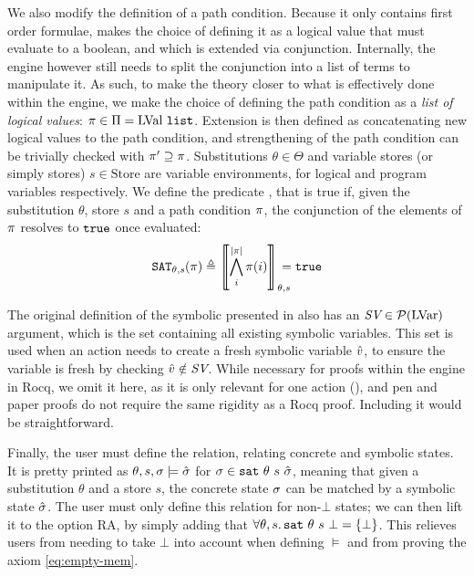 We also modify the definition of a path condition. Because it only contains first order formulae, \cite{cse1,cse2} makes the choice of defining it as a logical value that must evaluate to a boolean, and which is extended via conjunction. Internally, the engine however still needs to split the conjunction into a list of terms to manipulate it. As such, to make the theory closer to what is effectively done within the engine, we make the choice of defining the path condition as a \emph{list of logical values}: $\pi\in\Pi=\text{LVal}~\texttt{list}$. Extension is then defined as concatenating new logical values to the path condition, and strengthening of the path condition can be trivially checked with $\pi'\supseteq\pi$. Substitutions $\theta\in\Theta$ and variable stores (or simply stores) $s\in\text{Store}$ are variable environments, for logical and program variables respectively. We define the predicate , that is true if, given the substitution $\theta$, store $s$ and a path condition $\pi$, the conjunction of the elements of $\pi$ resolves to $\texttt{true}$ once evaluated:
\begin{align*}
	\texttt{SAT}_{\mathit{\theta,s}}(\pi) \triangleq \left\llbracket \bigwedge_{i}^{|\pi|}\pi(i) \right\rrbracket_{\theta,s} \hspace{-1em} = \texttt{true}
\end{align*}

\begin{remark}
	The original definition of the symbolic \execac{} presented in \cite{cse2} also has an $\textit{SV}\in{\cal P}(\text{LVar})$ argument, which is the set containing all existing symbolic variables. This set is used when an action needs to create a fresh symbolic variable $\hat{v}$, to ensure the variable is fresh by checking $\hat{v}\notin \textit{SV}$. While necessary for proofs within the engine in Rocq, we omit it here, as it is only relevant for one action (\alloc), and pen and paper proofs do not require the same rigidity as a Rocq proof. Including it would be straightforward.
\end{remark}

Finally, the user must define the  relation, relating concrete and symbolic states. It is pretty printed as $\theta,s,\sigma\models \hat{\sigma}$ for $\sigma\in\texttt{sat}~\theta~s~\hat{\sigma}$, meaning that given a substitution $\theta$ and a store $s$, the concrete state $\sigma$ can be matched by a symbolic state $\hat{\sigma}$. The user must only define this relation for non-$\bot$ states; we can then lift it to the option RA, by simply adding that $\forall \theta, s\ldotp \texttt{sat}~\theta~s~\bot=\{\bot\}$. This relieves users from needing to take $\bot$ into account when defining $\models$ and from proving the axiom \ref{eq:empty-mem}.

